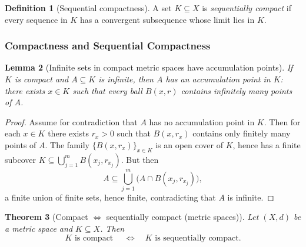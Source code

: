 \documentclass[12pt]{article}
\numberwithin{equation}{section}
\theoremstyle{plain}
\newtheorem{theorem}{Theorem}[section]
\newtheorem{lemma}[theorem]{Lemma}
\theoremstyle{definition}
\newtheorem{definition}[theorem]{Definition}
\theoremstyle{remark}
\begin{document}
\begin{definition}[Sequential compactness]\label{ms:def:seq-compact}
A set $K\subseteq X$ is \emph{sequentially compact} if every sequence in $K$ has a convergent subsequence
whose limit lies in $K$.
\end{definition}

\subsubsection{Compactness and Sequential Compactness}

\begin{lemma}[Infinite sets in compact metric spaces have accumulation points]\label{ms:lem:accumulation}
If $K$ is compact and $A\subseteq K$ is infinite, then $A$ has an accumulation point in $K$:
there exists $x\in K$ such that every ball $B(x,r)$ contains infinitely many points of $A$.
\end{lemma}

\begin{proof}
Assume for contradiction that $A$ has no accumulation point in $K$.
Then for each $x\in K$ there exists $r_x>0$ such that $B(x,r_x)$ contains only finitely many points of $A$.
The family $\{B(x,r_x)\}_{x\in K}$ is an open cover of $K$, hence has a finite subcover
$K\subseteq \bigcup_{j=1}^m B(x_j,r_{x_j})$.
But then
\[
A \subseteq \bigcup_{j=1}^m \bigl(A\cap B(x_j,r_{x_j})\bigr),
\]
a finite union of finite sets, hence finite, contradicting that $A$ is infinite.
\end{proof}

\begin{theorem}[Compact $\Longleftrightarrow$ sequentially compact (metric spaces)]\label{ms:thm:compact-seqcompact}
Let $(X,d)$ be a metric space and $K\subseteq X$. Then
\[
K \text{ is compact } \quad\Longleftrightarrow\quad K \text{ is sequentially compact.}
\]
\end{theorem}
\end{document}
